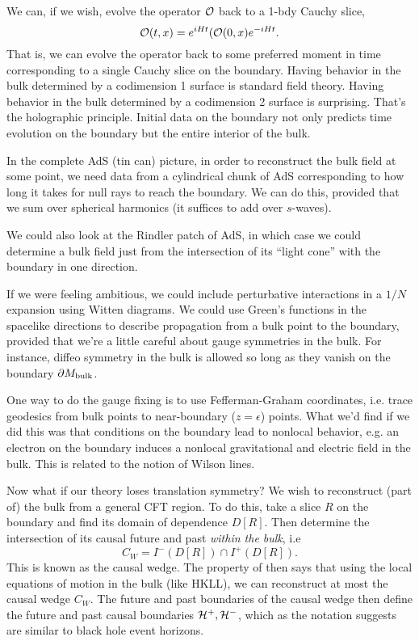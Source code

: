 We can, if we wish, evolve the operator $\mathcal O$ back to a 1-bdy Cauchy slice,
\begin{equation}
    \mathcal O(t,x)=e^{iHt}(\mathcal O(0,x) e^{-iHt}.
\end{equation}
That is, we can evolve the operator back to some preferred moment in time corresponding to a single Cauchy slice on the boundary. Having behavior in the bulk determined by a codimension 1 surface is standard field theory. Having behavior in the bulk determined by a codimension 2 surface is surprising. That's the holographic principle. Initial data on the boundary not only predicts time evolution on the boundary but the entire interior of the bulk.

In the complete AdS (tin can) picture, in order to reconstruct the bulk field at some point, we need data from a cylindrical chunk of AdS corresponding to how long it takes for null rays to reach the boundary. We can do this, provided that we sum over spherical harmonics (it suffices to add over $s$-waves).

We could also look at the Rindler patch of AdS, in which case we could determine a bulk field just from the intersection of its ``light cone'' with the boundary in one direction.

If we were feeling ambitious, we could include perturbative interactions in a $1/N$ expansion using Witten diagrams. We could use Green's functions in the spacelike directions to describe propagation from a bulk point to the boundary, provided that we're a little careful about gauge symmetries in the bulk. For instance, diffeo symmetry in the bulk is allowed so long as they vanish on the boundary $\partial M_\text{bulk}$.

One way to do the gauge fixing is to use Fefferman-Graham coordinates, i.e. trace geodesics from bulk points to near-boundary ($z=\epsilon$) points. What we'd find if we did this was that conditions on the boundary lead to nonlocal behavior, e.g. an electron on the boundary induces a nonlocal gravitational and electric field in the bulk. This is related to the notion of Wilson lines.

Now what if our theory loses translation symmetry? We wish to reconstruct (part of) the bulk from a general CFT region. To do this, take a slice $R$ on the boundary and find its domain of dependence $D[R]$. Then determine the intersection of its causal future and past \emph{within the bulk}, i.e
\begin{equation}
    C_W= I^-(D[R])\cap I^+(D[R]).
\end{equation}
This is known as the causal wedge. The property of  then says that using the local equations of motion in the bulk (like HKLL), we can reconstruct at most the causal wedge $C_W$. The future and past boundaries of the causal wedge then define the future and past causal boundaries $\mathcal H^+,\mathcal H^-$, which as the notation suggests are similar to black hole event horizons.

